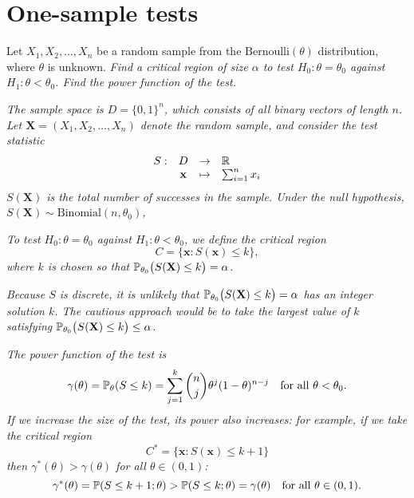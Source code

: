 
\section{One-sample tests}\label{sec:nhst_one_sample_tests}

\begin{example}
 Let $X_1,X_2,\ldots,X_n$ be a random sample from the $\text{Bernoulli}(\theta)$ distribution, where $\theta$ is unknown.
\ben
\it Find a critical region of size $\alpha$ to test $H_0:\theta=\theta_0$ against $H_1:\theta<\theta_0$.
\it Find the power function of the test.
\een
\end{example}

\begin{solution}
\bit
\it The sample space is $D = \{0,1\}^n$, which consists of all binary vectors of length $n$.
\eit
Let $\mathbf{X}=(X_1,X_2,\ldots,X_n)$ denote the random sample, and consider the test statistic 
\[
\begin{array}{rccl}
S: & D & \to & \mathbb{R} \\
 & \mathbf{x} & \mapsto & \sum_{i=1}^n x_i
\end{array}
\]
\bit
\it $S(\mathbf{X})$ is the total number of successes in the sample.
\it Under the null hypothesis, $S(\mathbf{X})\sim\text{Binomial}(n,\theta_0)$,
\eit

\ben
\it %
To test $H_0:\theta=\theta_0$ against $H_1:\theta<\theta_0$, we define the critical region
\[
C = \{\mathbf{x} : S(\mathbf{x}) \leq k\},
\]
where $k$ is chosen so that $\mathbb{P}_{\theta_0}\big(S(\mathbf{X})\leq k\big) = \alpha$.

\bit
\it Because $S$ is \emph{discrete}, it is unlikely that $\mathbb{P}_{\theta_0}\big(S(\mathbf{X})\leq k\big) = \alpha$ has an integer solution $k$.
\it The cautious approach would be to take the largest value of $k$ satisfying $\mathbb{P}_{\theta_0}\big(S(\mathbf{X})\leq k\big) \leq \alpha$.
\eit

\it %
The power function of the test is
\[
\gamma(\theta) 
	= \mathbb{P}_{\theta}(S\leq k) 
	= \sum_{j=1}^k\binom{n}{j}\theta^j(1-\theta)^{n-j} \quad\text{for all $\theta < \theta_0$.}
\]	
\een
If we increase the size of the test, its power also increases: for example, if we take the critical region
\[
C^{*} = \{\mathbf{x} : S(\mathbf{x}) \leq k+1 \}
\]
then $\gamma^{*}(\theta) > \gamma(\theta)$ for all $\theta\in(0,1)$:
\[
\gamma^{*}(\theta) 
	= \mathbb{P}(S\leq k+1;\theta)
	> \mathbb{P}(S\leq k;\theta) 
	= \gamma(\theta) \text{\quad for all $\theta\in(0,1)$.}
\]
\end{solution}


